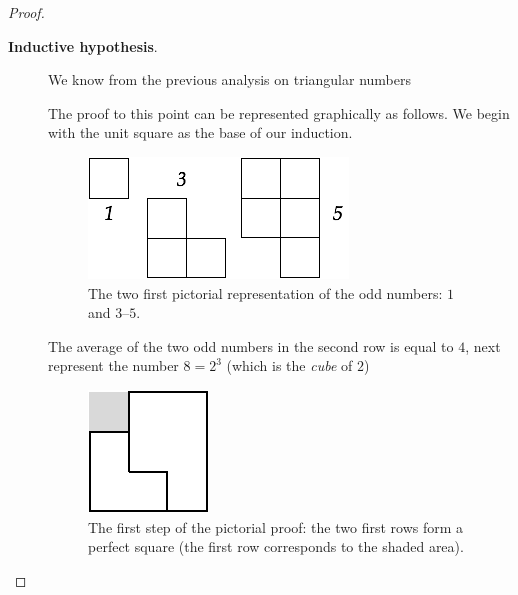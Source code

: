 \begin{proof}
\begin{description}
\medskip

\item[{\bf Inductive hypothesis}.]
We know from the previous analysis on triangular numbers


\medskip

The proof to this point can be represented graphically as follows.  We begin with
the unit square as the base of our induction.
\begin{figure}[ht]
\begin{center}
       \includegraphics[scale=0.4]{FiguresMaths/SumCubes1}
\caption{The two first pictorial representation of the odd numbers: $1$ and $3$--$5$.}
       \label{fig:sumCubes1}
\end{center}
\end{figure}
The average of the two odd numbers in the second row is equal to $4$,
 next represent the number $8 = 2^3$ (which is the {\em cube} of $2$)
\begin{figure}[ht]
\begin{center}
       \includegraphics[scale=0.5]{FiguresMaths/SumCubes1bis}
\caption{The first step of the pictorial proof: the two first rows form a perfect square
(the first row corresponds to the shaded area).}
       \label{fig:sumCubes1bis}
\end{center}
\end{figure}


\end{description}
\end{proof}
